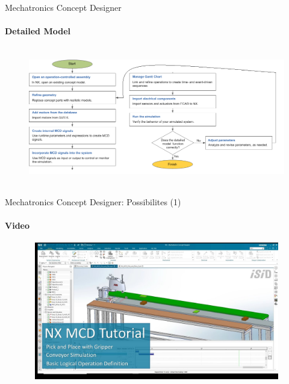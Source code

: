 \documentclass[aspectratio=169]{beamer}
\begin{document}
\begin{frame}[t]{Mechatronics Concept Designer}
\framesubtitle{Detailed Model}
    \vspace{-0.6cm}
    \begin{figure}[H]
        \centering\includegraphics[height=6cm,width=1\textwidth,keepaspectratio]{mcd_detailed_model_flowchart.png}
        \label{fig:mcd_detailed_model_flowchart.png}
    \end{figure}
\end{frame}

\begin{frame}[t]{Mechatronics Concept Designer: Possibilites (1)}
    \framesubtitle{Video}
    \vspace{-0.6cm}
    \begin{figure}[H]
        \href{https://youtu.be/x3ncDZdelRY?t=2381}{
            \centering\includegraphics[height=6cm,width=1\textwidth,keepaspectratio]{mcd_video1_preview.jpg}}
        \label{fig:mcd_video1_preview.jpg}
    \end{figure}
\end{frame}
\end{document}
